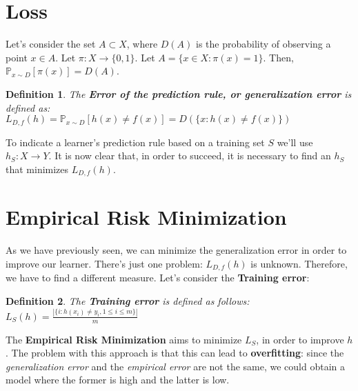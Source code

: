 \documentclass[12pt, a4paper, english]{report}
\newtheorem{definition}{Definition}
\begin{document}
\section{Loss}
Let's consider the set $A \subset X$, where $D(A)$ is the probability of observing a point $x \in A$.\newline
Let $\pi: X \rightarrow \{0, 1\}$.\newline
Let $A = \{x \in X: \pi(x) = 1\}$.\newline
Then, $\mathbb{P}_{x \sim D}[\pi(x)] = D(A)$.
\begin{definition}
    The \textbf{Error of the prediction rule, or generalization error} is defined as:\\
    $L_{D,f}(h) = \mathbb{P}_{x \sim D}[h(x) \neq f(x)] = D(\{x: h(x) \neq f(x)\})$
\end{definition}
To indicate a learner's prediction rule based on a training set $S$ we'll use $h_{S}:X \rightarrow Y$.\newline
It is now clear that, in order to succeed, it is necessary to find an $h_{S}$ that minimizes $L_{D,f}(h)$.
\section{Empirical Risk Minimization}
As we have previously seen, we can minimize the generalization error in order to improve our learner.\newline
There's just one problem: $L_{D,f}(h)$ is unknown. Therefore, we have to find a different measure.\newline
Let's consider the \textbf{Training error}:
\begin{definition}
    The \textbf{Training error} is defined as follows:\\
    $L_{S}(h) = \frac{|\{i: h(x_{i}) \neq y_{i}, 1 \leq i \leq m\}|}{m}$
\end{definition}
The \textbf{Empirical Risk Minimization} aims to minimize $L_{S}$, in order to improve $h$.\newline
The problem with this approach is that this can lead to \textbf{overfitting}:
since the \emph{generalization error} and the \emph{empirical error} are not the same, we could obtain a model where the former is high and the latter is low.
\end{document}
